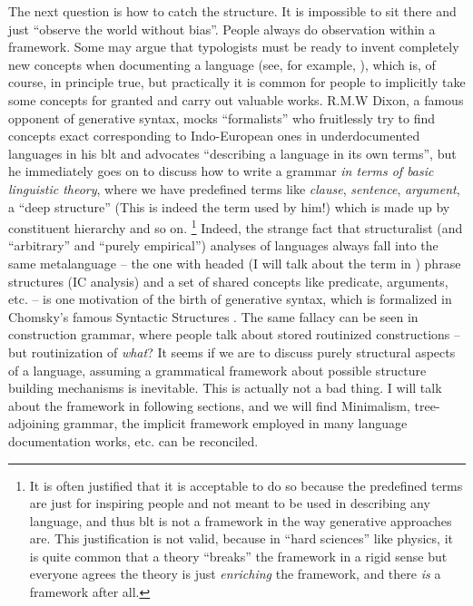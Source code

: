 \documentclass[../main.tex]{subfiles}
\begin{document}
The next question is how to catch the structure. It is impossible to sit there and just ``observe the world without bias''. People always do observation within a 
framework. Some may argue that typologists must be ready to invent completely new concepts when documenting 
a language (see, for example, \citet{haspelmath2008framework}), which is, of course, in principle true, 
but practically it is common for people to implicitly take some concepts for granted and carry out 
valuable works. R.M.W Dixon, a famous opponent of generative syntax, mocks ``formalists'' who fruitlessly try 
to find concepts exact corresponding to Indo-European ones in underdocumented languages in his 
\ac{blt} \citep{dixon2009basic} and advocates ``describing a language in its own terms'',
but he immediately goes on to discuss how to write a grammar \emph{in terms of basic linguistic theory},
where we have predefined terms like \emph{clause}, \emph{sentence}, \emph{argument}, a ``deep structure''
(This is indeed the term used by him!) which is made up by constituent hierarchy and so on. %
\footnote{
    It is often justified that it is acceptable to do so because the predefined terms are just for inspiring 
    people and not meant to be used in describing any language, and thus \ac{blt} is not a framework in the way generative approaches are. This justification is not valid, because in 
    ``hard sciences'' like physics, it is quite common that a theory ``breaks'' the framework in a rigid sense 
    but everyone agrees the theory is just \emph{enriching} the framework, and there \emph{is} a framework after all.
}%
Indeed, the strange fact that structuralist (and ``arbitrary'' and ``purely empirical'') analyses of 
languages always fall into the same metalanguage -- the one with headed (I will talk about the term in 
) phrase structures (IC analysis) and a set of shared concepts like predicate, 
arguments, etc. -- is one motivation of the birth of generative syntax, which is formalized in Chomsky's 
famous Syntactic Structures \citep{chomsky2009syntactic}. The same fallacy can be seen in construction grammar,
where people talk about stored routinized constructions -- but routinization of \emph{what}? 
It seems if we are to discuss purely structural aspects of a language, assuming a grammatical framework 
about possible structure building mechanisms is inevitable. This is actually not a bad thing. I will 
talk about the framework in following sections, and we will find Minimalism, tree-adjoining
grammar, the implicit framework employed in many language documentation works, etc. can be reconciled.
\end{document}
